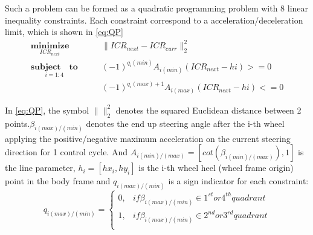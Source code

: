 Such a problem can be formed as a quadratic programming problem with 8 linear inequality constraints. Each constraint correspond to a acceleration/deceleration limit, which is shown in \cref{eq:QP}
\begin{equation} \label{eq:QP}
	\begin{split}
		\underset{ICR_{next}}{\textbf{minimize}} \qquad &\parallel ICR_{next}-ICR_{curr}\parallel_2^2\\
		\underset{i=1:4}{\textbf{subject} \quad \textbf{to}} \qquad &(-1)^{q_i(min)}A_{i(min)}(ICR_{next}-hi)>=0\\
												  &(-1)^{q_i(max)+1}A_{i(max)}(ICR_{next}-hi)<=0
	\end{split}
\end{equation}


\begin{figure}[!ht]
	\centering
	\caption{}
	\label{}
\end{figure}



In \cref{eq:QP}, the symbol $\parallel \parallel_2^2$ denotes the squared Euclidean distance between 2 points.$\beta_{i(max)/(min)}$ denotes the end up steering angle after the i-th wheel applying the positive/negative 
maximum acceleration on the current steering direction for 1 control cycle. And $A_{i(min)/(max)}=[cot(\beta_{i(min)/(max)}),1]$ is the line parameter,  $h_i=[hx_i,hy_i]$ is the i-th wheel heel
(wheel frame origin) point in the body frame and $q_{i(max)/(min)}$ is a sign indicator for each constraint:
\begin{equation}
	q_{i(max)/(min)}=
	\begin{cases}
		0,&if \beta_{i(max)/(min)}\in 1^{st}or4^{th} quadrant\\
		1,&if \beta_{i(max)/(min)}\in 2^{nd}or3^{rd} quadrant\\
	\end{cases}
\end{equation}

